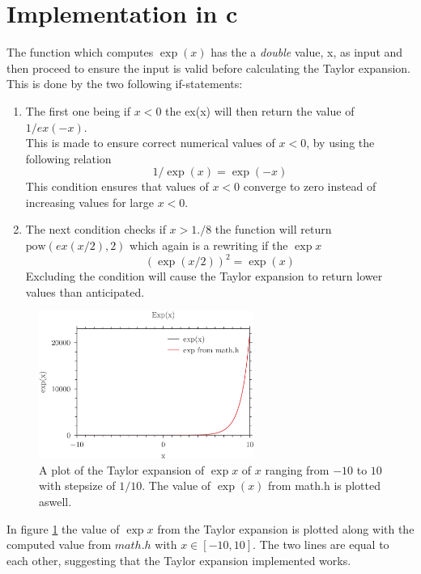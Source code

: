 \documentclass{article}
\begin{document}
\section*{Implementation in c}
The function which computes $\exp{(x)}$ has the a \textit{double} value, x, as input and then proceed to ensure the input is valid before calculating the Taylor expansion. This is done by the two following if-statements:
\begin{enumerate}
    \item The first one being if $x<0$ the ex(x) will then return the value of $1/ex(-x)$.\\This is made to ensure correct numerical values of $x<0$, by using the following relation
    \begin{equation}
        1/\exp{(x)} = \exp{(-x)}
    \end{equation}
    This condition ensures that values of $x<0$ converge to zero instead of increasing values for large $x<0$.
    \item The next condition checks if $x>1./8$ the function will return $\text{pow}(ex(x/2),2)$ which again is a rewriting if the $\exp{x}$
    \begin{equation}
        \left(\exp{(x/2)}\right)^2 = \exp{(x)}
    \end{equation}
    Excluding the condition will cause the Taylor expansion to return lower values than anticipated.
\end{enumerate}
\begin{figure}[h!]
    \centering
    \includegraphics[width=70mm]{exp.png}
    \caption{A plot of the Taylor expansion of $\exp{x}$ of $x$ ranging from $-10$ to $10$ with stepsize of $1/10$. The value of $\exp{(x)}$ from math.h is plotted aswell.}
    \label{TaylorPlot}
\end{figure}
In figure \ref{TaylorPlot} the value of $\exp{x}$ from the Taylor expansion is plotted along with the computed value from $math.h$ with $x\in[-10,10]$. The two lines are equal to each other, suggesting that the Taylor expansion implemented works.\\\\
\end{document}
